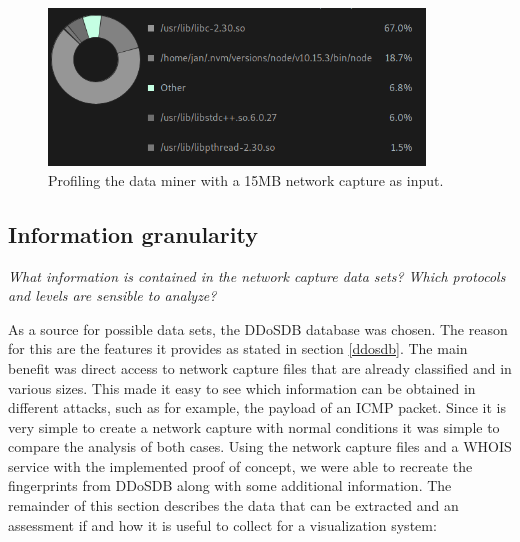     \begin{figure}[]
    \centering
    \includegraphics[width=10cm]{images/profiling.png}
    \caption{Profiling the data miner with a 15MB network capture as input.}
    \label{fig:profiling}
\end{figure}


\subsection{Information granularity}
\textit{What information is contained in the network capture data sets? Which protocols and levels are sensible to analyze?
}

As a source for possible data sets, the DDoSDB database was chosen. The reason for this are the features it provides as stated in section \ref{ddosdb}. The main benefit was direct access to network capture files that are already classified and in various sizes. This made it easy to see which information can be obtained in different attacks, such as for example, the payload of an ICMP packet. Since it is very simple to create a network capture with normal conditions it was simple to compare the analysis of both cases.
Using the network capture files and a WHOIS service with the implemented proof of concept, we were able to recreate the fingerprints from DDoSDB along with some additional information. The remainder of this section describes the data that can be extracted and an assessment if and how it is useful to collect for a visualization system:

